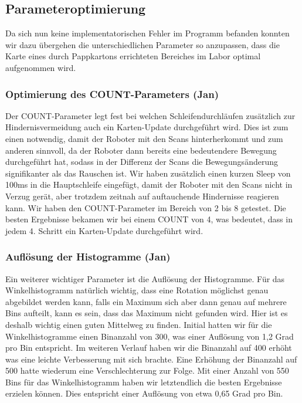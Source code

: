 \subsection{Parameteroptimierung}

Da sich nun keine implementatorischen Fehler im Programm befanden konnten wir dazu übergehen die unterschiedlichen Parameter so anzupassen, dass die Karte eines durch Pappkartons errichteten Bereiches im Labor optimal aufgenommen wird.

\subsubsection{Optimierung des COUNT-Parameters (Jan)}

Der COUNT-Parameter legt fest bei welchen Schleifendurchläufen zusätzlich zur Hindernisvermeidung auch ein Karten-Update durchgeführt wird. Dies ist zum einen notwendig, damit der Roboter mit den Scans hinterherkommt und zum anderen sinnvoll, da der Roboter dann bereits eine bedeutendere Bewegung durchgeführt hat, sodass in der Differenz der Scans die Bewegungsänderung signifikanter als das Rauschen ist. Wir haben zusätzlich einen kurzen Sleep von 100ms in die Hauptschleife eingefügt, damit der Roboter mit den Scans nicht in Verzug gerät, aber trotzdem zeitnah auf auftauchende Hindernisse reagieren kann.
Wir haben den COUNT-Parameter im Bereich von 2 bis 8 getestet. Die besten Ergebnisse bekamen wir bei einem COUNT von 4, was bedeutet, dass in jedem 4. Schritt ein Karten-Update durchgeführt wird.




\subsubsection{Auflösung der Histogramme (Jan)}

Ein weiterer wichtiger Parameter ist die Auflösung der Histogramme.
Für das Winkelhistogramm natürlich wichtig, dass eine Rotation möglichst genau abgebildet werden kann, falls ein Maximum sich aber dann genau auf mehrere Bins aufteilt, kann es sein, dass das Maximum nicht gefunden wird. Hier ist es deshalb wichtig einen guten Mittelweg zu finden. Initial hatten wir für die Winkelhistogramme einen Binanzahl von 300, was einer Auflösung von 1,2 Grad pro Bin entspricht. Im weiteren Verlauf haben wir die Binanzahl auf 400 erhöht was eine leichte Verbesserung mit sich brachte. Eine Erhöhung der Binanzahl auf 500 hatte wiederum eine Verschlechterung zur Folge. Mit einer Anzahl von 550 Bins für das Winkelhistogramm haben wir letztendlich die besten Ergebnisse erzielen können. Dies entspricht einer Auflösung von etwa 0,65 Grad pro Bin.

